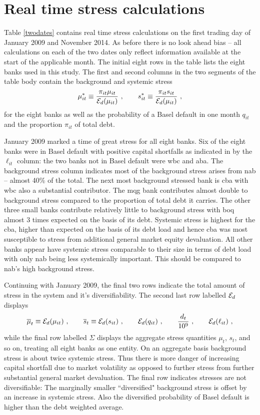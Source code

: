 \documentclass[authoryear]{elsarticle}
\newcommand{\Ex}{{\cal E}}
\newcommand{\tref}[1]{Table \ref{#1}}
\newcommand{\cq}{\ , \qquad}
\begin{document}
\section*{Real time stress calculations}
 \tref{twodates} contains real time stress calculations on the first trading day of  January 2009 and November 2014.  As before there is no look ahead bias -- all calculations on each of the two dates only reflect information available at the start of the applicable month.  The initial eight rows in the table lists the eight banks used in this study.   The first  and second columns in the two segments of the table body contain the background and systemic stress
$$
\mu^*_{it} \equiv \frac{\pi_{it}\mu_{it}}{\Ex_d(\mu_{it})}\cq s^*_{it} \equiv \frac{\pi_{it}s_{it}}{\Ex_d(\mu_{it})}\ , 
$$
for the eight banks as well as the probability of a Basel default in one month $q_{it}$ and the proportion $\pi_{it}$ of total debt.

January 2009 marked a time of great stress for all eight banks.    Six of the eight banks were in Basel default with positive capital shortfalls as indicated in by the $\ell_{it}$ column:   the two banks not in Basel default were wbc and aba.   The background stress column indicates most of the background stress arises from nab -- almost 40\% of the total.   The next most background stressed bank is cba with wbc also a substantial contributor.   The mqg bank contributes almost double to background stress compared to the proportion of total debt  it carries.  The other three small banks contribute relatively little to background stress with boq  almost 3 times expected on the basis of its debt.   Systemic stress is highest for the cba, higher than expected on the basis of its debt load and hence cba was most susceptible to stress from additional general market equity devaluation.    All other banks appear have systemic stress comparable to their size in terms of debt load with only nab being less systemically important.    This should be compared to nab's high background stress.

Continuing with January 2009, the final two rows indicate the total amount of stress in the system and it's diversifiability.    
The second last  row labelled $\Ex_d$  displays
$$
\overline{\mu}_t\equiv \Ex_d(\mu_{it})\cq \overline{s}_t\equiv\Ex_d(s_{it})\cq\Ex_d(q_{it})\cq \frac{d_t}{10^9}\cq \Ex_d(\ell_{it})\ ,
$$
while the final row labelled $\Sigma$ displays the aggregate stress quantities $\mu_t$, $s_t$, and so on, treating all eight banks as one entity.
On an aggregate basis background stress is about twice systemic stress.   Thus there is more danger of increasing capital shortfall due to market volatility  as opposed to further stress from further substantial general market devaluation.  The final row indicates stresses are not diversifiable:    The marginally  smaller  ``diversified"  background stress is offset by an increase in systemic stress.    Also the diversified probability of Basel default is higher than the debt weighted average.   
\end{document}
